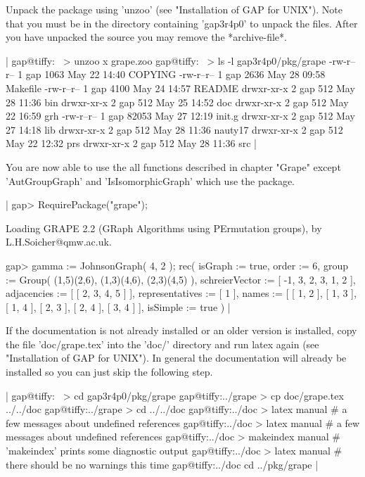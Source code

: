 Unpack the  package using 'unzoo'  (see "Installation  of GAP for UNIX").
Note that you must  be in the directory  containing 'gap3r4p0'  to unpack
the files.   After   you have unpacked  the  source  you may   remove the
*archive-file*.

|    gap@tiffy:~ > unzoo x grape.zoo
    gap@tiffy:~ > ls -l gap3r4p0/pkg/grape
    -rw-r--r--    1 gap   1063 May 22 14:40 COPYING
    -rw-r--r--    1 gap   2636 May 28 09:58 Makefile
    -rw-r--r--    1 gap   4100 May 24 14:57 README
    drwxr-xr-x    2 gap    512 May 28 11:36 bin
    drwxr-xr-x    2 gap    512 May 25 14:52 doc
    drwxr-xr-x    2 gap    512 May 22 16:59 grh
    -rw-r--r--    1 gap  82053 May 27 12:19 init.g
    drwxr-xr-x    2 gap    512 May 27 14:18 lib
    drwxr-xr-x    2 gap    512 May 28 11:36 nauty17
    drwxr-xr-x    2 gap    512 May 22 12:32 prs
    drwxr-xr-x    2 gap    512 May 28 11:36 src |

You are now able  to use the  all functions described in  chapter "Grape"
except 'AutGroupGraph' and  'IsIsomorphicGraph'  which use the   {\nauty}
package.

|    gap> RequirePackage("grape");

    Loading  GRAPE 2.2  (GRaph Algorithms using PErmutation groups),
    by L.H.Soicher@qmw.ac.uk.

    gap> gamma := JohnsonGraph( 4, 2 );
    rec(
      isGraph := true,
      order := 6,
      group := Group( (1,5)(2,6), (1,3)(4,6), (2,3)(4,5) ),
      schreierVector := [ -1, 3, 2, 3, 1, 2 ],
      adjacencies := [ [ 2, 3, 4, 5 ] ],
      representatives := [ 1 ],
      names := [ [ 1, 2 ], [ 1, 3 ], [ 1, 4 ], [ 2, 3 ], [ 2, 4 ],
          [ 3, 4 ] ],
      isSimple := true ) |

If the   documentation is not already   installed or an older  version is
installed, copy the  file  'doc/grape.tex' into the 'doc/'  directory and
run  latex again (see "Installation of   GAP for UNIX").   In general the
documentation   will already be   installed  so you    can just skip  the
following  step.  

|    gap@tiffy:~ > cd gap3r4p0/pkg/grape
    gap@tiffy:../grape > cp doc/grape.tex ../../doc
    gap@tiffy:../grape > cd ../../doc
    gap@tiffy:../doc > latex manual
    # a few messages about undefined references
    gap@tiffy:../doc > latex manual
    # a few messages about undefined references
    gap@tiffy:../doc > makeindex manual
    # 'makeindex' prints some diagnostic output
    gap@tiffy:../doc > latex manual
    # there should be no warnings this time
    gap@tiffy:../doc cd ../pkg/grape |

